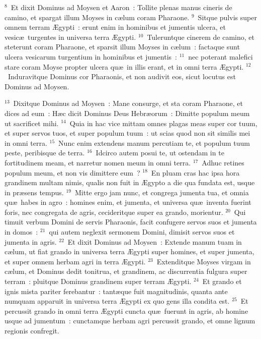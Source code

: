 ${}^{8}$~Et dixit Dominus ad Moysen et Aaron~: Tollite plenas manus cineris de camino, et spargat illum Moyses in c\ae lum coram Pharaone.
${}^{9}$~Sitque pulvis super omnem terram \AE gypti~: erunt enim in hominibus et jumentis ulcera, et vesic\ae\ turgentes in universa terra \AE gypti.
${}^{10}$~Tuleruntque cinerem de camino, et steterunt coram Pharaone, et sparsit illum Moyses in c\ae lum~: factaque sunt ulcera vesicarum turgentium in hominibus et jumentis~:
${}^{11}$~nec poterant malefici stare coram Moyse propter ulcera qu\ae\ in illis erant, et in omni terra \AE gypti.
${}^{12}$~Induravitque Dominus cor Pharaonis, et non audivit eos, sicut locutus est Dominus ad Moysen.


${}^{13}$~Dixitque Dominus ad Moysen~: Mane consurge, et sta coram Pharaone, et dices ad eum~: H\ae c dicit Dominus Deus Hebr\ae orum~: Dimitte populum meum ut sacrificet mihi.
${}^{14}$~Quia in hac vice mittam omnes plagas meas super cor tuum, et super servos tuos, et super populum tuum~: ut scias quod non sit similis mei in omni terra.
${}^{15}$~Nunc enim extendens manum percutiam te, et populum tuum peste, peribisque de terra.
${}^{16}$~Idcirco autem posui te, ut ostendam in te fortitudinem meam, et narretur nomen meum in omni terra.
${}^{17}$~Adhuc retines populum meum, et non vis dimittere eum~?
${}^{18}$~En pluam cras hac ipsa hora grandinem multam nimis, qualis non fuit in \AE gypto a die qua fundata est, usque in pr\ae sens tempus.
${}^{19}$~Mitte ergo jam nunc, et congrega jumenta tua, et omnia qu\ae\ habes in agro~: homines enim, et jumenta, et universa qu\ae\ inventa fuerint foris, nec congregata de agris, cecideritque super ea grando, morientur.
${}^{20}$~Qui timuit verbum Domini de servis Pharaonis, facit confugere servos suos et jumenta in domos~:
${}^{21}$~qui autem neglexit sermonem Domini, dimisit servos suos et jumenta in agris.
${}^{22}$~Et dixit Dominus ad Moysen~: Extende manum tuam in c\ae lum, ut fiat grando in universa terra \AE gypti super homines, et super jumenta, et super omnem herbam agri in terra \AE gypti.
${}^{23}$~Extenditque Moyses virgam in c\ae lum, et Dominus dedit tonitrua, et grandinem, ac discurrentia fulgura super terram~: pluitque Dominus grandinem super terram \AE gypti.
${}^{24}$~Et grando et ignis mista pariter ferebantur~: tant\ae que fuit magnitudinis, quanta ante numquam apparuit in universa terra \AE gypti ex quo gens illa condita est.
${}^{25}$~Et percussit grando in omni terra \AE gypti cuncta qu\ae\ fuerunt in agris, ab homine usque ad jumentum~: cunctamque herbam agri percussit grando, et omne lignum regionis confregit.

